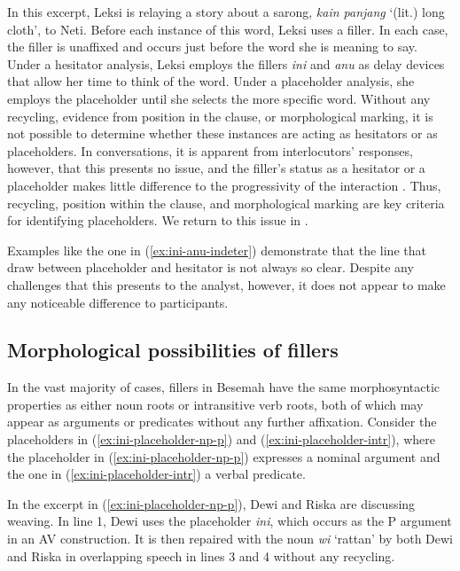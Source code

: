 \documentclass[output=paper,
\ChapterDOI{10.5281/zenodo.15697583}
colorlinks,
citecolor=brown]{langscibook}
\begin{document}
In this excerpt, Leksi is relaying a story about a sarong, \textit{kain panjang} `(lit.) long cloth', to Neti. Before each instance of this word, Leksi uses a filler. In each case, the filler is unaffixed and occurs just before the word she is meaning to say. Under a hesitator analysis, Leksi employs the fillers \textit{ini} and \textit{anu} as delay devices that allow her time to think of the word. Under a placeholder analysis, she employs the placeholder until she selects the more specific word. Without any recycling, evidence from position in the clause, or morphological marking, it is not possible to determine whether these instances are acting as hesitators or as placeholders. In conversations, it is apparent from interlocutors' responses, however, that this presents no issue, and the filler's status as a hesitator or a placeholder makes little difference to the progressivity of the interaction \parencite{schegloff2007sequence}. Thus, recycling, position within the clause, and morphological marking are key criteria for identifying placeholders. We return to this issue in .


Examples like the one in (\ref{ex:ini-anu-indeter}) demonstrate that the line that \citet{hayashi2006crosslinguistic} draw between placeholder and hesitator is not always so clear. Despite any challenges that this presents to the analyst, however, it does not appear to make any noticeable difference to participants. 


\subsection{Morphological possibilities of fillers}\label{sec:morphological-possibilities}
In the vast majority of cases, fillers in Besemah have the same morphosyntactic properties as either noun roots or intransitive verb roots, both of which may appear as arguments or predicates without any further affixation. Consider the placeholders in (\ref{ex:ini-placeholder-np-p}) and (\ref{ex:ini-placeholder-intr}), where the placeholder in (\ref{ex:ini-placeholder-np-p}) expresses a nominal argument and the one in (\ref{ex:ini-placeholder-intr}) a verbal predicate.

In the excerpt in (\ref{ex:ini-placeholder-np-p}), Dewi and Riska are discussing weaving. In line 1, Dewi uses the placeholder \textit{ini}, which occurs as the P argument in an AV construction. It is then repaired with the noun \textit{wi} `rattan' by both Dewi and Riska in overlapping speech in lines 3 and 4 without any recycling.
\end{document}
